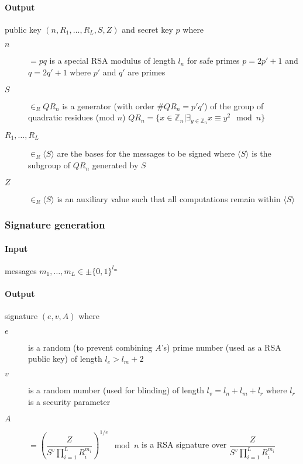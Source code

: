 \paragraph{Output}
  public key $(n, R_1, \dots, R_L, S, Z)$ and
  secret key $p$ where
\begin{description}
  \item[$n$] $= pq$ is a special RSA modulus of length $l_n$ for safe primes
    $p = 2p' + 1$ and $q = 2q' + 1$ where $p'$ and $q'$ are primes
  \item[$S$] $\in_R QR_n$ is a generator (with order $\#QR_n = p'q'$) of the
    group of quadratic residues (mod $n$)
    $QR_n = \{x \in \mathbb{Z}_n | \exists_{y \in \mathbb{Z}_n} x \equiv y^2 \mod n \}$
  \item[$R_1, \dots, R_L$] $\in_R \langle S \rangle$ are the bases for the
    messages to be signed where $\langle S \rangle$ is the subgroup of $QR_n$
    generated by $S$
  \item[$Z$] $\in_R \langle S \rangle$ is an auxiliary value such that all
    computations remain within $\langle S \rangle$
\end{description}


\subsubsection{Signature generation}\label{sec:cl_basic-sign}

\paragraph{Input} messages $m_1, \dots, m_L \in \pm \{0,1\}^{l_m}$

\paragraph{Output} signature $(e, v, A)$ where
\begin{description}
  \item[$e$] is a random (to prevent combining $A$'s) prime number (used as a RSA public key) of length $l_e > l_m + 2$
  \item[$v$] is a random number (used for blinding) of length $l_v = l_n + l_m + l_r$ where $l_r$ is a security parameter
  \item[$A$] $=\left(\dfrac{Z}{S^v \prod_{i=1}^{L} R_i^{m_i}} \right)^{1/e} \mod n$ is a RSA signature over $\dfrac{Z}{S^v \prod_{i=1}^{L} R_i^{m_i}}$
\end{description}


